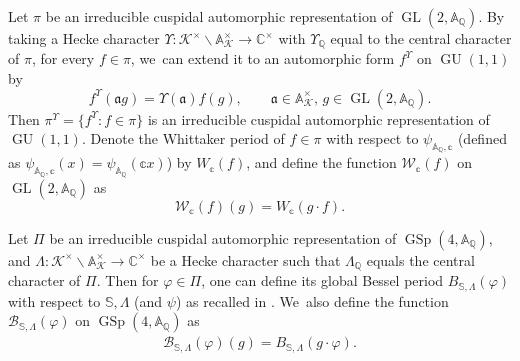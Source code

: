 \documentclass[JEP,XML,SOM,Unicode,published]{cedram}
\theoremstyle{plain}
\theoremstyle{remark}
\newcommand{\bA}{\mathbb{A}}
\newcommand{\bC}{\mathbb{C}}
\newcommand{\bQ}{\mathbb{Q}}
\newcommand{\bS}{\mathbb{S}}
\newcommand{\bbc}{\mathbb{c}}
\newcommand{\cB}{\mathcal{B}}
\newcommand{\cK}{\mathcal{K}}
\newcommand{\cW}{\mathcal{W}}
\newcommand{\fa}{\mathfrak{a}}
\DeclareMathOperator{\GL}{GL}
\DeclareMathOperator{\GSp}{GSp}
\DeclareMathOperator{\GU}{GU}
\let\mf f
\let\Bes\cB
\let\bes B
\let\Whi\cW
\let\whi W
\begin{document}
Let $\pi$ be an irreducible cuspidal automorphic representation of $\GL(2,\bA_\bQ)$. By taking a Hecke character $\Upsilon:\cK^\times\backslash\bA^\times_\cK\to\bC^\times$ with $\Upsilon_\bQ$ equal to the central character of $\pi$, for every $f\in\pi$, we~can extend it to an automorphic form $f^\Upsilon$ on $\GU(1,1)$ by
\begin{equation}\label{eq:extGL2}
\mf^\Upsilon(\fa g)=\Upsilon(\fa)f(g), \qquad\fa\in\bA^\times_\cK,\,g\in\GL(2,\bA_\bQ).
\end{equation}
Then $\pi^{\Upsilon}=\{f^\Upsilon:f\in\pi\}$ is an irreducible cuspidal automorphic representation of $\GU(1,1)$. Denote the Whittaker period of $f\in \pi$ with respect to $\psi_{\bA_\bQ,\bbc}$ (defined as $\psi_{\bA_\bQ,\bbc}(x)=\psi_{\bA_\bQ}(\bbc x)$) by $\whi_\bbc(f)$, and define the function $\Whi_\bbc(f)$ on $\GL(2,\bA_\bQ)$ as
\[
\Whi_\bbc(f)(g)=\whi_\bbc(g\cdot f).
\]

Let $\Pi$ be an irreducible cuspidal automorphic representation of $\GSp(4,\bA_\bQ)$, and $\Lambda:\cK^\times\backslash\bA^\times_\cK\to\bC^\times$ be a Hecke character such that $\Lambda_\bQ$ equals the central character of $\Pi$. Then for $\varphi\in \Pi$, one can define its global Bessel period $\bes_{\bS,\Lambda}(\varphi)$ with respect to $\bS,\Lambda$ (and $\psi$) as recalled in \cite[\S2.2.1]{pFL}. We~also define the function $\Bes_{\bS,\Lambda}(\varphi)$ on $\GSp(4,\bA_\bQ)$ as
\begin{align*}
\Bes_{\bS,\Lambda}(\varphi)(g)=\bes_{\bS,\Lambda}(g\cdot \varphi).
\end{align*}
\end{document}
